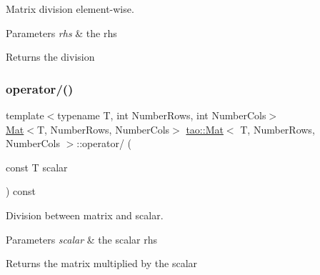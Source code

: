 Matrix division element-\/wise. 


\begin{DoxyParams}{Parameters}
{\em rhs} & the rhs \\
\hline
\end{DoxyParams}
\begin{DoxyReturn}{Returns}
the division 
\end{DoxyReturn}
\mbox{\label{classtao_1_1_mat_ac7fd637d3e6f33bfd0de2e906a6d2501}} 
\subsubsection{\texorpdfstring{operator/()}{operator/()}\hspace{0.1cm}{\footnotesize\ttfamily [2/2]}}
{\footnotesize\ttfamily template$<$typename T, int Number\+Rows, int Number\+Cols$>$ \\
\mbox{\hyperlink{classtao_1_1_mat}{Mat}}$<$T, Number\+Rows, Number\+Cols$>$ \mbox{\hyperlink{classtao_1_1_mat}{tao\+::\+Mat}}$<$ T, Number\+Rows, Number\+Cols $>$\+::operator/ (\begin{DoxyParamCaption}\item[{const T}]{scalar }\end{DoxyParamCaption}) const\hspace{0.3cm}{\ttfamily [inline]}}



Division between matrix and scalar. 


\begin{DoxyParams}{Parameters}
{\em scalar} & the scalar rhs \\
\hline
\end{DoxyParams}
\begin{DoxyReturn}{Returns}
the matrix multiplied by the scalar 
\end{DoxyReturn}
\mbox{\label{classtao_1_1_mat_a93efaf5ad6559b2a8a847b8ce3efc6b0}} 
